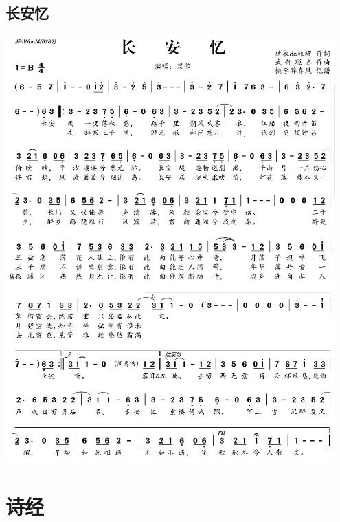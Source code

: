 \documentclass[cn,pad,twocol]{elegantbook}
\begin{document}
\section{长安忆}                \includegraphics[width=0.95\textwidth]{rpi400/20210123-长安忆.jpg}

\chapter{诗经}
\end{document}

